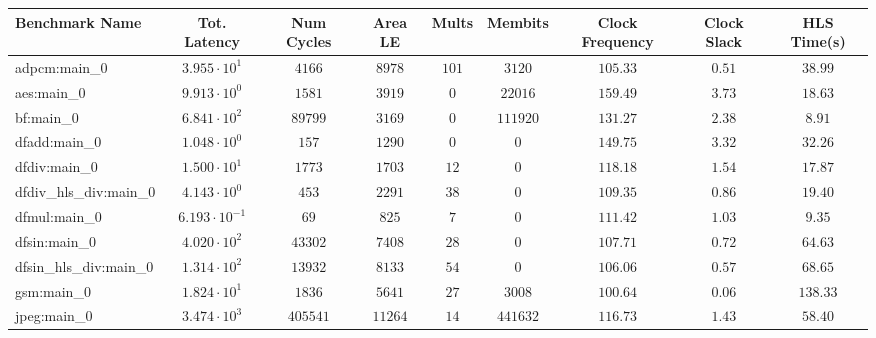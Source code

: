 \begin{tabular}{|l|c|c|c|c|c|c|c|c|}
\hline
Benchmark Name          & Tot. Latency            & Num Cycles & Area LE   & Mults   & Membits    & Clock Frequency & Clock Slack & HLS Time(s) \\
\hline
adpcm:main\_0           & $ 3.955 \cdot 10^{1}  $ & $ 4166   $ & $ 8978  $ & $ 101 $ & $ 3120   $ & $ 105.33      $ & $ 0.51    $ & $ 38.99   $ \\
aes:main\_0             & $ 9.913 \cdot 10^{0}  $ & $ 1581   $ & $ 3919  $ & $ 0   $ & $ 22016  $ & $ 159.49      $ & $ 3.73    $ & $ 18.63   $ \\
bf:main\_0              & $ 6.841 \cdot 10^{2}  $ & $ 89799  $ & $ 3169  $ & $ 0   $ & $ 111920 $ & $ 131.27      $ & $ 2.38    $ & $ 8.91    $ \\
dfadd:main\_0           & $ 1.048 \cdot 10^{0}  $ & $ 157    $ & $ 1290  $ & $ 0   $ & $ 0      $ & $ 149.75      $ & $ 3.32    $ & $ 32.26   $ \\
dfdiv:main\_0           & $ 1.500 \cdot 10^{1}  $ & $ 1773   $ & $ 1703  $ & $ 12  $ & $ 0      $ & $ 118.18      $ & $ 1.54    $ & $ 17.87   $ \\
dfdiv\_hls\_div:main\_0 & $ 4.143 \cdot 10^{0}  $ & $ 453    $ & $ 2291  $ & $ 38  $ & $ 0      $ & $ 109.35      $ & $ 0.86    $ & $ 19.40   $ \\
dfmul:main\_0           & $ 6.193 \cdot 10^{-1} $ & $ 69     $ & $ 825   $ & $ 7   $ & $ 0      $ & $ 111.42      $ & $ 1.03    $ & $ 9.35    $ \\
dfsin:main\_0           & $ 4.020 \cdot 10^{2}  $ & $ 43302  $ & $ 7408  $ & $ 28  $ & $ 0      $ & $ 107.71      $ & $ 0.72    $ & $ 64.63   $ \\
dfsin\_hls\_div:main\_0 & $ 1.314 \cdot 10^{2}  $ & $ 13932  $ & $ 8133  $ & $ 54  $ & $ 0      $ & $ 106.06      $ & $ 0.57    $ & $ 68.65   $ \\
gsm:main\_0             & $ 1.824 \cdot 10^{1}  $ & $ 1836   $ & $ 5641  $ & $ 27  $ & $ 3008   $ & $ 100.64      $ & $ 0.06    $ & $ 138.33  $ \\
jpeg:main\_0            & $ 3.474 \cdot 10^{3}  $ & $ 405541 $ & $ 11264 $ & $ 14  $ & $ 441632 $ & $ 116.73      $ & $ 1.43    $ & $ 58.40   $ \\

\end{tabular}

